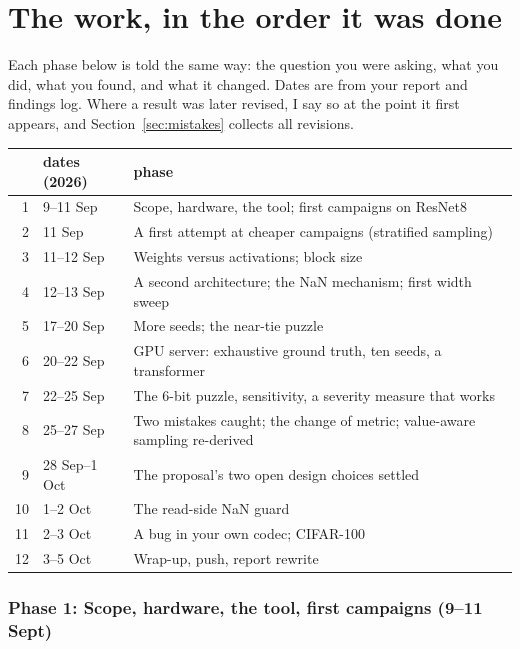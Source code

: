 \part{The work, in the order it was done}

Each phase below is told the same way: the question you were asking, what you did, what you found, and what it changed. Dates are from your report and findings log.
Where a result was later revised, I say so at the point it first appears, and Section~\ref{sec:mistakes} collects all revisions.

\begin{center}
\small
\begin{tabular}{@{}rp{3.3cm}p{9.7cm}@{}}
\toprule
 & dates (2026) & phase \\
\midrule
1 & 9--11 Sep & Scope, hardware, the tool; first campaigns on ResNet8 \\
2 & 11 Sep & A first attempt at cheaper campaigns (stratified sampling) \\
3 & 11--12 Sep & Weights versus activations; block size \\
4 & 12--13 Sep & A second architecture; the NaN mechanism; first width sweep \\
5 & 17--20 Sep & More seeds; the near-tie puzzle \\
6 & 20--22 Sep & GPU server: exhaustive ground truth, ten seeds, a transformer \\
7 & 22--25 Sep & The 6-bit puzzle, sensitivity, a severity measure that works \\
8 & 25--27 Sep & Two mistakes caught; the change of metric; value-aware sampling re-derived \\
9 & 28 Sep--1 Oct & The proposal's two open design choices settled \\
10 & 1--2 Oct & The read-side NaN guard \\
11 & 2--3 Oct & A bug in your own codec; CIFAR-100 \\
12 & 3--5 Oct & Wrap-up, push, report rewrite \\
\bottomrule
\end{tabular}
\end{center}

\section{Phase 1: Scope, hardware, the tool, first campaigns (9--11 Sept)}

